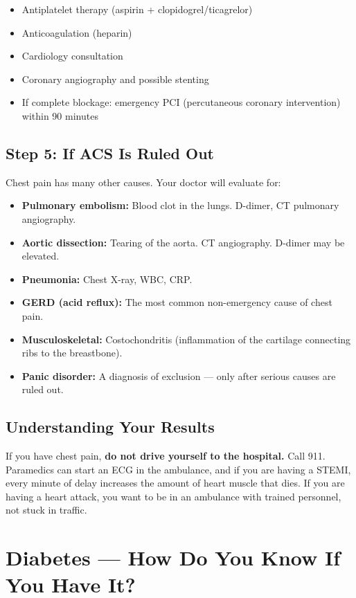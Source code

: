 \begin{itemize}
    \item Antiplatelet therapy (aspirin + clopidogrel/ticagrelor)
    \item Anticoagulation (heparin)
    \item Cardiology consultation
    \item Coronary angiography and possible stenting
    \item If complete blockage: emergency PCI (percutaneous coronary intervention) within 90 minutes
\end{itemize}

\subsection{Step 5: If ACS Is Ruled Out}

Chest pain has many other causes. Your doctor will evaluate for:
\begin{itemize}
    \item \textbf{Pulmonary embolism:} Blood clot in the lungs. D-dimer, CT pulmonary angiography.
    \item \textbf{Aortic dissection:} Tearing of the aorta. CT angiography. D-dimer may be elevated.
    \item \textbf{Pneumonia:} Chest X-ray, WBC, CRP.
    \item \textbf{GERD (acid reflux):} The most common non-emergency cause of chest pain.
    \item \textbf{Musculoskeletal:} Costochondritis (inflammation of the cartilage connecting ribs to the breastbone).
    \item \textbf{Panic disorder:} A diagnosis of exclusion --- only after serious causes are ruled out.
\end{itemize}

\subsection{Understanding Your Results}

If you have chest pain, \textbf{do not drive yourself to the hospital.} Call 911. Paramedics can start an ECG in the ambulance, and if you are having a STEMI, every minute of delay increases the amount of heart muscle that dies. If you are having a heart attack, you want to be in an ambulance with trained personnel, not stuck in traffic.

\clearpage
\section{Diabetes --- How Do You Know If You Have It?}

